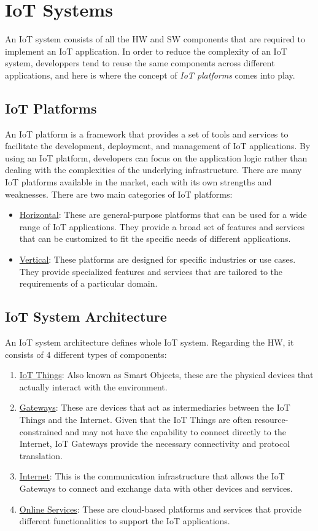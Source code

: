 \chapter{IoT Systems}

An IoT system consists of all the HW and SW components that are required to implement an IoT application. In order to reduce the complexity of an IoT system, developpers tend to reuse the same components across different applications, and here is where the concept of \emph{IoT platforms} comes into play.

\section{IoT Platforms}

An IoT platform is a framework that provides a set of tools and services to facilitate the development, deployment, and management of IoT applications. By using an IoT platform, developers can focus on the application logic rather than dealing with the complexities of the underlying infrastructure. There are many IoT platforms available in the market, each with its own strengths and weaknesses. There are two main categories of IoT platforms:
\begin{itemize}
    \item \ul{Horizontal}: These are general-purpose platforms that can be used for a wide range of IoT applications. They provide a broad set of features and services that can be customized to fit the specific needs of different applications.
    \item \ul{Vertical}: These platforms are designed for specific industries or use cases. They provide specialized features and services that are tailored to the requirements of a particular domain.
\end{itemize}

\section{IoT System Architecture}


An IoT system architecture defines whole IoT system. Regarding the HW, it consists of 4 different types of components:
\begin{enumerate}
    \item \ul{IoT Things}: Also known as Smart Objects, these are the physical devices that actually interact with the environment.
    \item \ul{Gateways}: These are devices that act as intermediaries between the IoT Things and the Internet. Given that the IoT Things are often resource-constrained and may not have the capability to connect directly to the Internet, IoT Gateways provide the necessary connectivity and protocol translation.
    \item \ul{Internet}: This is the communication infrastructure that allows the IoT Gateways to connect and exchange data with other devices and services.
    \item \ul{Online Services}: These are cloud-based platforms and services that provide different functionalities to support the IoT applications.
\end{enumerate}

